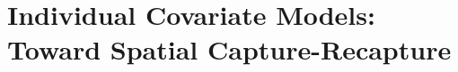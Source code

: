 \section{Individual Covariate Models: Toward Spatial Capture-Recapture}
\label{closed.sec.indcov}


